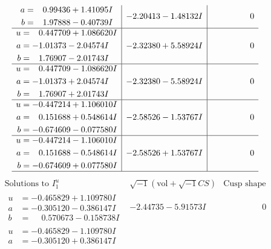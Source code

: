 \documentclass[1p]{elsarticle_modified}
\theoremstyle{definition}
\newcommand{\I}{\sqrt{-1}}
\begin{document}
$$\begin{array}{c|c|c}
\begin{aligned}
a &= \phantom{-}0.99436 + 1.41095 I \\
b &= \phantom{-}1.97888 - 0.40739 I\end{aligned}
 & -2.20413 - 1.48132 I & \phantom{-0.000000 } 0 \\ \hline\begin{aligned}
u &= \phantom{-}0.447709 + 1.086620 I \\
a &= -1.01373 - 2.04574 I \\
b &= \phantom{-}1.76907 - 2.01743 I\end{aligned}
 & -2.32380 + 5.58924 I & \phantom{-0.000000 } 0 \\ \hline\begin{aligned}
u &= \phantom{-}0.447709 - 1.086620 I \\
a &= -1.01373 + 2.04574 I \\
b &= \phantom{-}1.76907 + 2.01743 I\end{aligned}
 & -2.32380 - 5.58924 I & \phantom{-0.000000 } 0 \\ \hline\begin{aligned}
u &= -0.447214 + 1.106010 I \\
a &= \phantom{-}0.151688 + 0.548614 I \\
b &= -0.674609 - 0.077580 I\end{aligned}
 & -2.58526 - 1.53767 I & \phantom{-0.000000 } 0 \\ \hline\begin{aligned}
u &= -0.447214 - 1.106010 I \\
a &= \phantom{-}0.151688 - 0.548614 I \\
b &= -0.674609 + 0.077580 I\end{aligned}
 & -2.58526 + 1.53767 I & \phantom{-0.000000 } 0\\
 \hline 
 \end{array}$$\newpage$$\begin{array}{c|c|c}  
\text{Solutions to }I^u_{1}& \I (\text{vol} + \sqrt{-1}CS) & \text{Cusp shape}\\
 \hline 
\begin{aligned}
u &= -0.465829 + 1.109780 I \\
a &= -0.305120 - 0.386147 I \\
b &= \phantom{-}0.570673 - 0.158738 I\end{aligned}
 & -2.44735 - 5.91573 I & \phantom{-0.000000 } 0 \\ \hline\begin{aligned}
u &= -0.465829 - 1.109780 I \\
a &= -0.305120 + 0.386147 I \\

\end{aligned}
\end{array}$$
\end{document}
